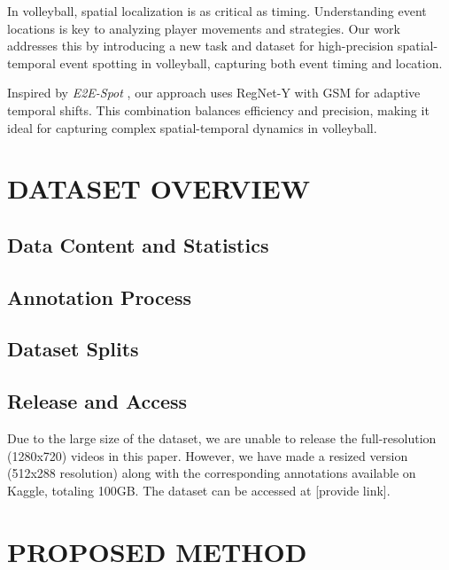\documentclass[a4paper,twoside]{article}
\begin{document}
In volleyball, spatial localization is as critical as timing. Understanding event locations is key to analyzing player movements and strategies. Our work addresses this by introducing a new task and dataset for high-precision spatial-temporal event spotting in volleyball, capturing both event timing and location.

Inspired by \textit{E2E-Spot} \cite{spot22}, our approach uses RegNet-Y \cite{radosavovic2020designingnetworkdesignspaces} with GSM \cite{9156729} for adaptive temporal shifts. This combination balances efficiency and precision, making it ideal for capturing complex spatial-temporal dynamics in volleyball.



\section{\uppercase{DATASET OVERVIEW}}
\subsection{Data Content and Statistics}
\subsection{Annotation Process}
\subsection{Dataset Splits}
\subsection{Release and Access}
Due to the large size of the dataset, we are unable to release the full-resolution (1280x720) videos in this paper. However, we have made a resized version (512x288 resolution) along with the corresponding annotations available on Kaggle, totaling 100GB. The dataset can be accessed at [provide link].


\section{\uppercase{PROPOSED METHOD}}
\end{document}
